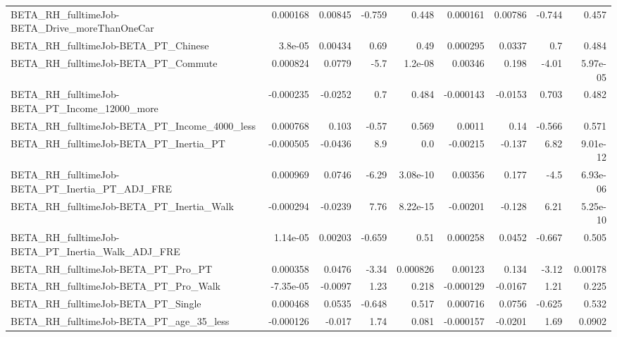 \begin{tabular}{lrrrrrrrr}
BETA\_RH\_fulltimeJob-BETA\_Drive\_moreThanOneCar      &    0.000168 &      0.00845 &   -0.759 &    0.448 &   0.000161 &     0.00786 &       -0.744 &         0.457 \\
BETA\_RH\_fulltimeJob-BETA\_PT\_Chinese                &     3.8e-05 &      0.00434 &     0.69 &     0.49 &   0.000295 &      0.0337 &          0.7 &         0.484 \\
BETA\_RH\_fulltimeJob-BETA\_PT\_Commute                &    0.000824 &       0.0779 &     -5.7 &  1.2e-08 &    0.00346 &       0.198 &        -4.01 &      5.97e-05 \\
BETA\_RH\_fulltimeJob-BETA\_PT\_Income\_12000\_more      &   -0.000235 &      -0.0252 &      0.7 &    0.484 &  -0.000143 &     -0.0153 &        0.703 &         0.482 \\
BETA\_RH\_fulltimeJob-BETA\_PT\_Income\_4000\_less       &    0.000768 &        0.103 &    -0.57 &    0.569 &     0.0011 &        0.14 &       -0.566 &         0.571 \\
BETA\_RH\_fulltimeJob-BETA\_PT\_Inertia\_PT             &   -0.000505 &      -0.0436 &      8.9 &      0.0 &   -0.00215 &      -0.137 &         6.82 &      9.01e-12 \\
BETA\_RH\_fulltimeJob-BETA\_PT\_Inertia\_PT\_ADJ\_FRE     &    0.000969 &       0.0746 &    -6.29 & 3.08e-10 &    0.00356 &       0.177 &         -4.5 &      6.93e-06 \\
BETA\_RH\_fulltimeJob-BETA\_PT\_Inertia\_Walk           &   -0.000294 &      -0.0239 &     7.76 & 8.22e-15 &   -0.00201 &      -0.128 &         6.21 &      5.25e-10 \\
BETA\_RH\_fulltimeJob-BETA\_PT\_Inertia\_Walk\_ADJ\_FRE   &    1.14e-05 &      0.00203 &   -0.659 &     0.51 &   0.000258 &      0.0452 &       -0.667 &         0.505 \\
BETA\_RH\_fulltimeJob-BETA\_PT\_Pro\_PT                 &    0.000358 &       0.0476 &    -3.34 & 0.000826 &    0.00123 &       0.134 &        -3.12 &       0.00178 \\
BETA\_RH\_fulltimeJob-BETA\_PT\_Pro\_Walk               &   -7.35e-05 &      -0.0097 &     1.23 &    0.218 &  -0.000129 &     -0.0167 &         1.21 &         0.225 \\
BETA\_RH\_fulltimeJob-BETA\_PT\_Single                 &    0.000468 &       0.0535 &   -0.648 &    0.517 &   0.000716 &      0.0756 &       -0.625 &         0.532 \\
BETA\_RH\_fulltimeJob-BETA\_PT\_age\_35\_less            &   -0.000126 &       -0.017 &     1.74 &    0.081 &  -0.000157 &     -0.0201 &         1.69 &        0.0902 \\

\end{tabular}
